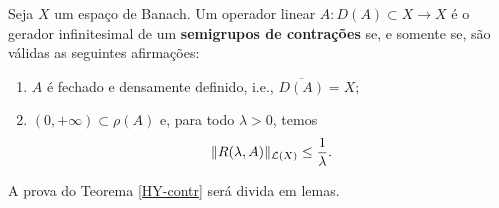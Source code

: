 \begin{theorem}\label{HY-contr}
Seja $X$ um espaço de Banach. Um operador linear $A:D(A)\subset X\longrightarrow X$ é o gerador infinitesimal de um 
\textbf{semigrupos de contrações} se, e somente se, são válidas as seguintes afirmações:
\begin{enumerate}[$(i)$]
\item $A$ é fechado e densamente definido, i.e., $\overline{D(A)}=X$; 
\item $(0,+\infty)\subset \rho(A)$ e, para todo $\lambda>0$, temos
\begin{equation*}
\|R(\lambda,A)\|_{\mathcal{L}(X)}\leq \frac{1}{\lambda}.
\end{equation*}
\end{enumerate}
\end{theorem}

A prova do Teorema \ref{HY-contr} será divida em  lemas.

